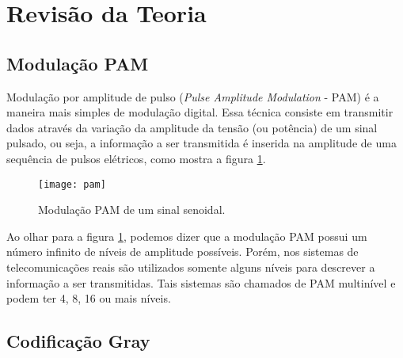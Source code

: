 \newpage
\section{Revisão da Teoria}

\subsection{Modulação PAM}

Modulação por amplitude de pulso (\textit{Pulse Amplitude Modulation} - PAM) é a maneira mais simples de modulação digital. Essa técnica consiste em transmitir dados através da variação da amplitude da tensão (ou potência) de um sinal pulsado, ou seja, a informação a ser transmitida é inserida na amplitude de uma sequência de pulsos elétricos, como mostra a figura \ref{fig:pam}. 

\begin{figure}[H]
    \centering
    \texttt{[image: pam]}
    \caption{Modulação PAM de um sinal senoidal.}
    \label{fig:pam}
\end{figure}

Ao olhar para a figura \ref{fig:pam}, podemos dizer que a modulação PAM possui um número infinito de níveis de amplitude possíveis. Porém, nos sistemas de telecomunicações reais são utilizados somente alguns níveis para descrever a informação a ser transmitidas. Tais sistemas são chamados de PAM multinível e podem ter 4, 8, 16 ou mais níveis.


\subsection{Codificação Gray}
